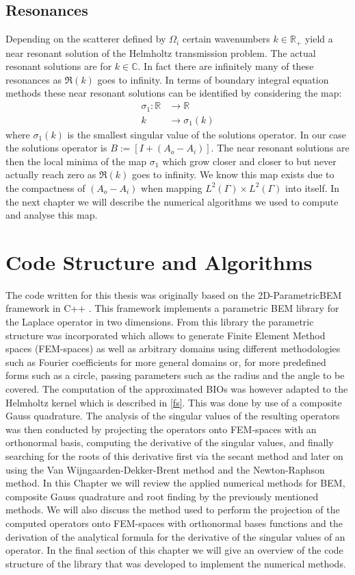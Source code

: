 \documentclass[a4paper, oneside]{discothesis}
\begin{document}
\section{Resonances}
Depending on the scatterer defined by $\Omega_i$ certain wavenumbers $k \in \mathbb{R}_+$ yield a near resonant solution of the Helmholtz transmission problem.
The actual resonant solutions are for $k \in \mathbb{C}$.
In fact there are infinitely many of these resonances as $\Re(k)$ goes to infinity. 
In terms of boundary integral equation methods these near resonant solutions can be identified by considering the map:
\begin{align}
	\sigma_1: \mathbb{R}&\longrightarrow\mathbb{R} \\
	k&\longrightarrow\sigma_1(k)
\end{align}
where $\sigma_1(k)$ is the smallest singular value of the solutions operator.
In our case the solutions operator is $B := [I +(A_o-A_i)]$.
The near resonant solutions are then the local minima of the map $\sigma_1$ which grow closer and closer to but never actually reach zero as $\Re(k)$ goes to infinity.
We know this map exists due to the compactness of $(A_o-A_i)$ when mapping $L^2(\Gamma)\times L^2(\Gamma)$ into itself.
In the next chapter we will describe the numerical algorithms we used to compute and analyse this map.

\chapter{Code Structure and Algorithms} \label{code}
The code written for this thesis was originally based on the 2D-ParametricBEM framework in C++ \cite{test}. 
This framework implements a parametric BEM library for the Laplace operator in two dimensions.
From this library the parametric structure was incorporated which allows to generate Finite Element Method spaces (FEM-spaces) as well as arbitrary domains using different methodologies such as Fourier coefficients for more general domains or, for more predefined forms such as a circle, passing parameters such as the radius and the angle to be covered.
The computation of the approximated BIOs was however adapted to the Helmholtz kernel which is described in \ref{fs}.
This was done by use of a composite Gauss quadrature.
The analysis of the singular values of the resulting operators was then conducted by projecting the operators onto FEM-spaces with an orthonormal basis, computing the derivative of the singular values, and finally searching for the roots of this derivative first via the secant method and later on using the Van Wijngaarden-Dekker-Brent method and the Newton-Raphson method.
In this Chapter we will review the applied numerical methods for BEM, composite Gauss quadrature and root finding by the previously mentioned methods.
We will also discuss the method used to perform the projection of the computed operators onto FEM-spaces with orthonormal bases functions and the derivation of the analytical formula for the derivative of the singular values of an operator.
In the final section of this chapter we will give an overview of the code structure of the library that was developed to implement the numerical methods.
\end{document}
